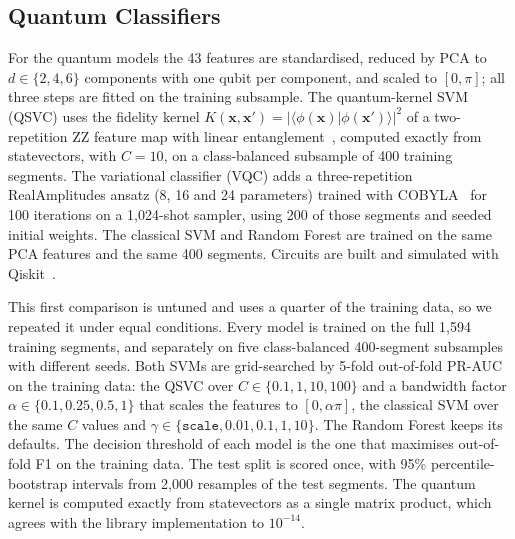 \documentclass[conference]{IEEEtran}
\begin{document}
\subsection{Quantum Classifiers}
For the quantum models the 43 features are standardised, reduced by PCA to
$d \in \{2,4,6\}$ components with one qubit per component, and scaled to $[0,\pi]$; all three
steps are fitted on the training subsample. The quantum-kernel SVM (QSVC) uses the fidelity
kernel $K(\mathbf{x},\mathbf{x}') = |\langle\phi(\mathbf{x})|\phi(\mathbf{x}')\rangle|^{2}$ of
a two-repetition ZZ feature map with linear entanglement~\cite{havlicek2019}, computed
exactly from statevectors, with $C = 10$, on a class-balanced subsample of 400 training
segments. The variational classifier (VQC) adds a three-repetition RealAmplitudes ansatz
(8, 16 and 24 parameters) trained with COBYLA~\cite{powell1994} for 100 iterations on a
1,024-shot sampler, using 200 of those segments and seeded initial weights. The classical SVM
and Random Forest are trained on the same PCA features and the same 400 segments. Circuits are
built and simulated with Qiskit~\cite{qiskit2024}.

This first comparison is untuned and uses a quarter of the training data, so we repeated it
under equal conditions. Every model is trained on the full 1,594 training segments, and
separately on five class-balanced 400-segment subsamples with different seeds. Both SVMs are
grid-searched by 5-fold out-of-fold PR-AUC on the training data: the QSVC over
$C \in \{0.1, 1, 10, 100\}$ and a bandwidth factor $\alpha \in \{0.1, 0.25, 0.5, 1\}$ that
scales the features to $[0, \alpha\pi]$, the classical SVM over the same $C$ values and
$\gamma \in \{\texttt{scale}, 0.01, 0.1, 1, 10\}$. The Random Forest keeps its defaults. The
decision threshold of each model is the one that maximises out-of-fold F1 on the training
data. The test split is scored once, with 95\% percentile-bootstrap intervals from 2,000
resamples of the test segments. The quantum kernel is computed exactly from statevectors as a
single matrix product, which agrees with the library implementation to $10^{-14}$.
\end{document}
